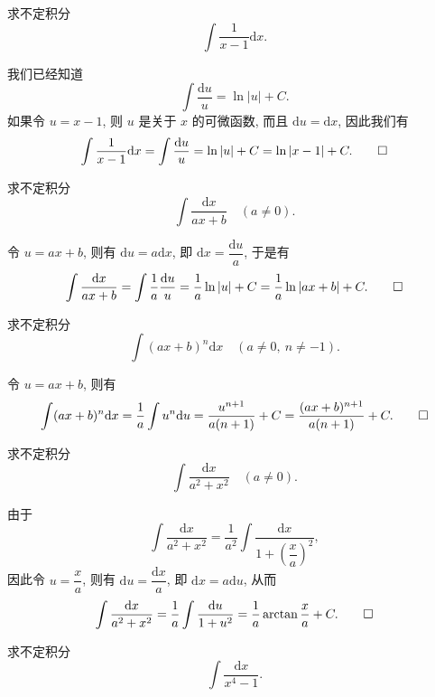 \begin{example}\label{example:ma-6-2-1}
求不定积分
\[
  \int\frac1{x-1}\mathrm dx.
\]
\end{example}


\begin{solve}
我们已经知道
\[
  \int\frac{\mathrm du}{u}=\ln|u|+C.
\]
如果令 $u=x-1$, 则 $u$ 是关于 $x$ 的可微函数, 而且 $\mathrm du=\mathrm dx$, 因此我们有
\[
  \int\frac1{x-1}\mathrm dx
  =
  \int\frac{\mathrm du}{u}
  =
  \ln|u|+C
  =
  \ln|x-1|+C.
\qedhere
\]
\end{solve}


\begin{example}\label{example:ma-6-2-2}
求不定积分
\[
  \int\frac{\mathrm dx}{ax+b}\quad (a\ne0).
\]
\end{example}


\begin{solve}
令 $u=ax+b$, 则有 $\mathrm du=a\mathrm dx$, 即 $\mathrm dx=\dfrac{\mathrm du}{a}$, 于是有
\[
  \int\frac{\mathrm dx}{ax+b}
  =
  \int\frac1a\frac{\mathrm du}{u}
  =
  \frac1a\ln|u|+C
  =
  \frac1a\ln|ax+b|+C.
\qedhere
\]
\end{solve}


\begin{example}\label{example:ma-6-2-3}
求不定积分
\[
  \int(ax+b)^n\mathrm dx\quad (a\ne0,\ n\ne-1).
\]
\end{example}


\begin{solve}
令 $u=ax+b$, 则有
\[
  \int(ax+b)^n\mathrm dx
  =
  \frac1a\int u^n\mathrm du
  =
  \frac{u^{n+1}}{a(n+1)}+C
  =
  \frac{(ax+b)^{n+1}}{a(n+1)}+C.
\qedhere
\]
\end{solve}


\begin{example}\label{example:ma-6-2-4}
求不定积分
\[
  \int\frac{\mathrm dx}{a^2+x^2}\quad (a\ne0).
\]
\end{example}


\begin{solve}
由于
\[
  \int\frac{\mathrm dx}{a^2+x^2}
  =
  \frac1{a^2}\int\frac{\mathrm dx}{1+\left(\dfrac xa\right)^2},
\]
因此令 $u=\dfrac xa$, 则有 $\mathrm du=\dfrac{\mathrm dx}{a}$, 即 $\mathrm dx=a\mathrm du$, 从而
\[
  \int\frac{\mathrm dx}{a^2+x^2}
  =
  \frac1a\int\frac{\mathrm du}{1+u^2}
  =
  \frac1a\arctan\frac xa+C.
\qedhere
\]
\end{solve}


\begin{example}\label{example:ma-6-2-5}
求不定积分
\[
  \int\frac{\mathrm dx}{x^4-1}.
\]
\end{example}


